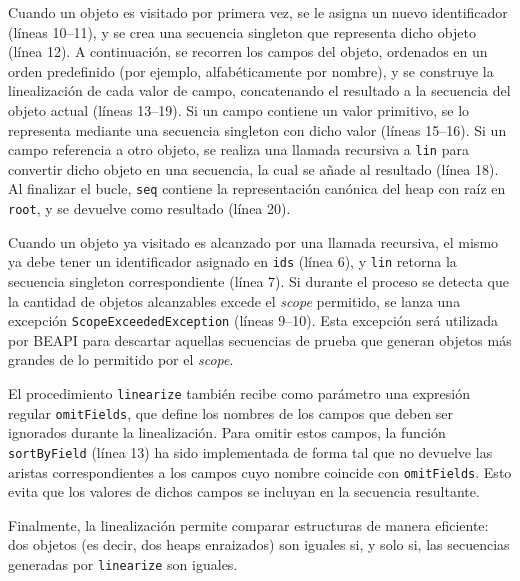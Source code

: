 Cuando un objeto es visitado por primera vez, se le asigna un nuevo identificador (líneas 10--11), y se crea una secuencia singleton 
que representa dicho objeto (línea 12). A continuación, se recorren los campos del objeto, ordenados en un orden predefinido (por 
ejemplo, alfabéticamente por nombre), y se construye la linealización de cada valor de campo, concatenando el resultado a la secuencia 
del objeto actual (líneas 13--19). Si un campo contiene un valor primitivo, se lo representa mediante una secuencia singleton con dicho 
valor (líneas 15--16). Si un campo referencia a otro objeto, se realiza una llamada recursiva a \texttt{lin} para convertir dicho objeto 
en una secuencia, la cual se añade al resultado (línea 18). Al finalizar el bucle, \texttt{seq} contiene la representación canónica del 
heap con raíz en \texttt{root}, y se devuelve como resultado (línea 20).

Cuando un objeto ya visitado es alcanzado por una llamada recursiva, el mismo ya debe tener un identificador asignado en \texttt{ids} 
(línea 6), y \texttt{lin} retorna la secuencia singleton correspondiente (línea 7). Si durante el proceso se detecta que la cantidad de 
objetos alcanzables excede el \emph{scope} permitido, se lanza una excepción \texttt{ScopeExceededException} (líneas 9--10). Esta 
excepción será utilizada por \textsf{BEAPI} para descartar aquellas secuencias de prueba que generan objetos más grandes de lo 
permitido por el \emph{scope}.

El procedimiento \texttt{linearize} también recibe como parámetro una expresión regular \texttt{omitFields}, que define los nombres 
de los campos que deben ser ignorados durante la linealización. Para omitir estos 
campos, la función \texttt{sortByField} (línea 13) ha sido implementada de forma tal que no devuelve las aristas correspondientes a 
los campos cuyo nombre coincide con \texttt{omitFields}. Esto evita que los valores de dichos campos se incluyan en la secuencia 
resultante.

Finalmente, la linealización permite comparar estructuras de manera eficiente: dos objetos (es decir, dos heaps enraizados) son iguales 
si, y solo si, las secuencias generadas por \texttt{linearize} son iguales.

